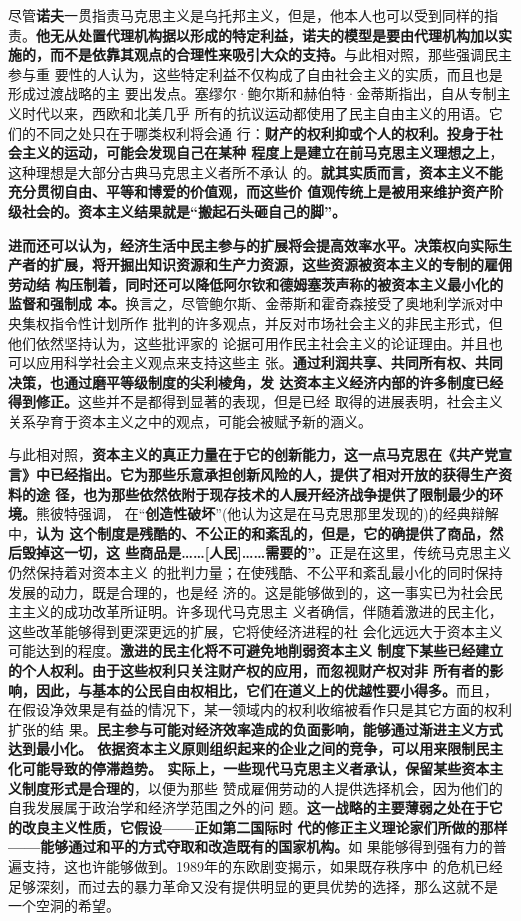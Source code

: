 尽管\textbf{诺夫}一贯指责马克思主义是乌托邦主义，但是，他本人也可以受到同样的指
责。\textbf{他无从处置代理机构据以形成的特定利益，诺夫的模型是要由代理机构加以实
  施的，而不是依靠其观点的合理性来吸引大众的支持。}与此相对照，那些强调民主参与重
要性的人认为，这些特定利益不仅构成了自由社会主义的实质，而且也是形成过渡战略的主
要出发点。塞缪尔·鲍尔斯和赫伯特·金蒂斯指出，自从专制主义时代以来，西欧和北美几乎
所有的抗议运动都使用了民主自由主义的用语。它们的不同之处只在于哪类权利将会通
行：\textbf{财产的权利抑或个人的权利。投身于社会主义的运动，可能会发现自己在某种
  程度上是建立在前马克思主义理想之上}，这种理想是大部分古典马克思主义者所不承认
的。\textbf{就其实质而言，资本主义不能充分贯彻自由、平等和博爱的价值观，而这些价
  值观传统上是被用来维护资产阶级社会的。资本主义结果就是“搬起石头砸自己的脚”。}

\textbf{进而还可以认为，经济生活中民主参与的扩展将会提高效率水平。决策权向实际生
  产者的扩展，将开掘出知识资源和生产力资源，这些资源被资本主义的专制的雇佣劳动结
  构压制着，同时还可以降低阿尔钦和德姆塞茨声称的被资本主义最小化的监督和强制成
  本。}换言之，尽管鲍尔斯、金蒂斯和霍奇森接受了奥地利学派对中央集权指令性计划所作
批判的许多观点，并反对市场社会主义的非民主形式，但他们依然坚持认为，这些批评家的
论据可用作民主社会主义的论证理由。并且也可以应用科学社会主义观点来支持这些主
张。\textbf{通过利润共享、共同所有权、共同决策，也通过磨平等级制度的尖利棱角，发
  达资本主义经济内部的许多制度已经得到修正。}这些并不是都得到显著的表现，但是已经
取得的进展表明，社会主义关系孕育于资本主义之中的观点，可能会被赋予新的涵义。

与此相对照，\textbf{资本主义的真正力量在于它的创新能力，这一点马克思在《共产党宣
  言》中已经指出。它为那些乐意承担创新风险的人，提供了相对开放的获得生产资料的途
  径，也为那些依然依附于现存技术的人展开经济战争提供了限制最少的环境。}熊彼特强调，
在“\textbf{创造性破坏}”(他认为这是在马克思那里发现的)的经典辩解中，\textbf{认为
  这个制度是残酷的、不公正的和紊乱的，但是，它的确提供了商品，然后毁掉这一切，这
  些商品是……[人民]……需要的”。}正是在这里，传统马克思主义仍然保持着对资本主义
的批判力量；在使残酷、不公平和紊乱最小化的同时保持发展的动力，既是合理的，也是经
济的。这是能够做到的，这一事实已为社会民主主义的成功改革所证明。许多现代马克思主
义者确信，伴随着激进的民主化，这些改革能够得到更深更远的扩展，它将使经济进程的社
会化远远大于资本主义可能达到的程度。\textbf{激进的民主化将不可避免地削弱资本主义
  制度下某些已经建立的个人权利。由于这些权利只关注财产权的应用，而忽视财产权对非
  所有者的影响，因此，与基本的公民自由权相比，它们在道义上的优越性要小得多。}而且，
在假设净效果是有益的情况下，某一领域内的权利收缩被看作只是其它方面的权利扩张的结
果。\textbf{民主参与可能对经济效率造成的负面影响，能够通过渐进主义方式达到最小化。
  依据资本主义原则组织起来的企业之间的竞争，可以用来限制民主化可能导致的停滞趋势。
  实际上，一些现代马克思主义者承认，保留某些资本主义制度形式是合理的}，以便为那些
赞成雇佣劳动的人提供选择机会，因为他们的自我发展属于政治学和经济学范围之外的问
题。\textbf{这一战略的主要薄弱之处在于它的改良主义性质，它假设——正如第二国际时
  代的修正主义理论家们所做的那样——能够通过和平的方式夺取和改造既有的国家机构。}如
果能够得到强有力的普遍支持，这也许能够做到。1989年的东欧剧变揭示，如果既存秩序中
的危机已经足够深刻，而过去的暴力革命又没有提供明显的更具优势的选择，那么这就不是
一个空洞的希望。


